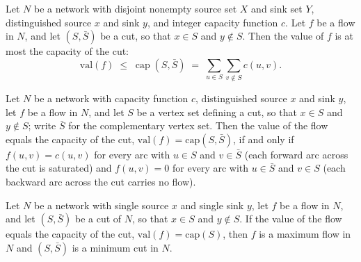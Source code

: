 \begin{theorem}
\label{Networks.val_le_capOf}
\leanok
{}
Let $N$ be a network with disjoint nonempty source set $X$ and sink set $Y$,
distinguished source $x$ and sink $y$, and integer capacity function $c$. Let $f$ be a
flow in $N$, and let $(S,\bar S)$ be a cut, so that $x\in S$ and $y\notin S$. Then the
value of $f$ is at most the capacity of the cut:
\[
\mathrm{val}(f)\;\le\;\operatorname{cap}(S,\bar S)\;=\;\sum_{u\in S}\sum_{v\notin S}
c(u,v).
\]
\end{theorem}

\begin{theorem}
\label{Networks.val_eq_capOf_iff}
\leanok
{}
Let $N$ be a network with capacity function $c$, distinguished source $x$ and sink $y$,
let $f$ be a flow in $N$, and let $S$ be a vertex set defining a cut, so that $x \in S$
and $y \notin S$; write $\bar S$ for the complementary vertex set. Then the value of the
flow equals the capacity of the cut, $\mathrm{val}(f) = \mathrm{cap}(S,\bar S)$, if and
only if $f(u,v) = c(u,v)$ for every arc with $u \in S$ and $v \in \bar S$ (each forward
arc across the cut is saturated) and $f(u,v) = 0$ for every arc with $u \in \bar S$ and
$v \in S$ (each backward arc across the cut carries no flow).
\end{theorem}

\begin{theorem}
\label{Networks.isMaxFlow_and_isMinCut_of_val_eq_cap}
\leanok
{}
Let $N$ be a network with single source $x$ and single sink $y$, let $f$ be a flow in
$N$, and let $(S, \bar S)$ be a cut of $N$, so that $x \in S$ and $y \notin S$. If the
value of the flow equals the capacity of the cut, $\mathrm{val}(f) = \mathrm{cap}(S)$,
then $f$ is a maximum flow in $N$ and $(S,\bar S)$ is a minimum cut in $N$.
\end{theorem}

